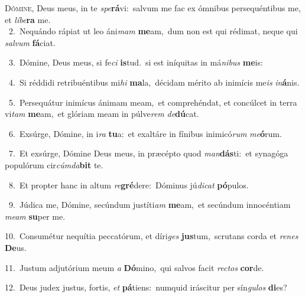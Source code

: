 \lettrine{\initial\textcolor{\initialcolor}{D}}{ómine,} Deus meus, in te \textit{spe}\-\textbf{rá}vi:~\star salvum me fac ex ómnibus persequéntibus me, et \textit{lí}\-\textit{be}\textbf{ra} me.\\
{\numbfont\textcolor{\numbcolor}{~2.}}~Nequándo rápiat ut leo áni\textit{mam} \textbf{me}\-am,~\star dum non est qui rédimat, neque qui \textit{sal}\-\textit{vum} \textbf{fá}\-ciat.\par
{\numbfont\textcolor{\numbcolor}{~3.}}~Dómine, Deus meus, si fe\textit{ci} \textbf{is}\-tud.~\star si est iníquitas in má\-\textit{ni}\-\textit{bus} \textbf{me}\-is:\par
{\numbfont\textcolor{\numbcolor}{~4.}}~Si réddidi retribuéntibus mi\textit{hi} \textbf{ma}\-la,~\star décidam mérito ab inimícis me\textit{is} \textit{in}\-\textbf{á}nis.\par
{\numbfont\textcolor{\numbcolor}{~5.}}~Persequátur inimícus ánimam meam,~\dagger et comprehéndat, et concúlcet in terra vi\textit{tam} \textbf{me}\-am,~\star et glóriam meam in púlve\textit{rem} \textit{de}\-\textbf{dú}cat.\par
{\numbfont\textcolor{\numbcolor}{~6.}}~Exsúrge, Dómine, in i\textit{ra} \textbf{tu}\-a:~\star et exaltáre in fínibus inimicó\textit{rum} \textit{me}\-\textbf{ó}rum.\par
{\numbfont\textcolor{\numbcolor}{~7.}}~Et exsúrge, Dómine Deus meus, in præcépto quod \textit{man}\-\textbf{dás}ti:~\star et synagóga populórum cir\-\textit{cúm}\-\textit{da}\textbf{bit} te.\par
{\numbfont\textcolor{\numbcolor}{~8.}}~Et propter hanc in altum \textit{re}\-\textbf{gré}dere:~\star Dóminus jú\-\textit{di}\-\textit{cat} \textbf{pó}\-pulos.\par
{\numbfont\textcolor{\numbcolor}{~9.}}~Júdica me, Dómine, secúndum justíti\textit{am} \textbf{me}\-am,~\star et secúndum innocéntiam \textit{me}\-\textit{am} \textbf{su}\-per me.\par
{\numbfont\textcolor{\numbcolor}{10.}}~Consumétur nequítia peccatórum, et díri\textit{ges} \textbf{jus}\-tum,~\star scrutans corda et \textit{re}\-\textit{nes} \textbf{De}\-us.\par
{\numbfont\textcolor{\numbcolor}{11.}}~Justum adjutórium meum \textit{a} \textbf{Dó}\-mino,~\star qui salvos facit \textit{rec}\-\textit{tos} \textbf{cor}\-de.\par
{\numbfont\textcolor{\numbcolor}{12.}}~Deus judex justus, fortis, \textit{et} \textbf{pá}\-tiens:~\star numquid iráscitur per sín\-\textit{gu}\-\textit{los} \textbf{di}\-es?\par

